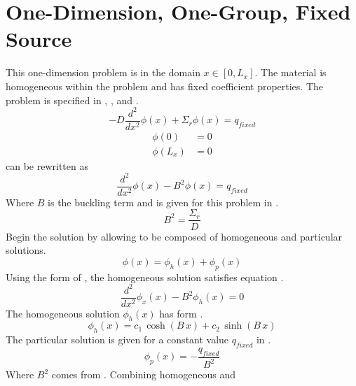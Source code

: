 \section{One-Dimension, One-Group, Fixed Source}
  \label{sec:deriv_1dfixedsrc}
  This one-dimension problem is in the domain $x \in [0,L_x]$. The material is
  homogeneous within the problem and has fixed coefficient properties.
  The problem is specified in , , and 
  .
  \begin{equation}
    \label{eq:1dfixed}
    -D \frac{d^2}{dx^2} \phi(x) + \Sigma_r \phi(x) = q_{fixed}
  \end{equation}
  \begin{align}
    \label{eq:1dfixed_bc1}
    \phi(0) &= 0 \\
    \label{eq:1dfixed_bc2}
    \phi(L_x) &= 0
  \end{align}
   can be rewritten as
  \begin{equation}
    \label{eq:1dfixed_buckle}
    \frac{d^2}{dx^2} \phi(x) - B^2 \phi(x) = q_{fixed}
  \end{equation}
  Where $B$ is the buckling term and is given for this problem in
  .
  \begin{equation}
    \label{eq:1dfixed_b2}
    B^2 = \frac{\Sigma_r}{D}
  \end{equation}
  Begin the solution by allowing to be composed of homogeneous and particular
  solutions. 
  \begin{equation} 
    \phi(x) = \phi_h(x) + \phi_p(x)
  \end{equation}
  Using the form of , the homogeneous solution satisfies 
  equation .
  \begin{equation}
    \label{eq:1dfixed_homog}
    \frac{d^2}{dx^2} \phi_x(x) - B^2 \phi_h(x) = 0
  \end{equation}
  The homogeneous solution $\phi_h(x)$ has form .
  \begin{equation}
    \label{eq:1dfixed_homog_form}
    \phi_h(x) = c_1 \, \cosh(B \, x) + c_2 \, \sinh(B \, x)
  \end{equation}
  The particular solution is given for a constant value $q_{fixed}$ in
  .
  \begin{equation}
    \label{eq:1dfixed_particular}
    \phi_p(x) = -\frac{q_{fixed}}{B^2}
  \end{equation}
  Where $B^2$ comes from . Combining homogeneous and 
